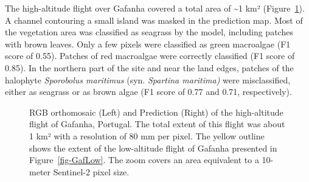 \documentclass[
  number]{elsarticle}
\begin{document}
The high-altitude flight over Gafanha covered a total area of
\textasciitilde1 km² (Figure~\ref{fig-GafHigh}). A channel contouring a
small island was masked in the prediction map. Most of the vegetation
area was classified as seagrass by the model, including patches with
brown leaves. Only a few pixels were classified as green macroalgae (F1
score of 0.55). Patches of red macroalgae were correctly classified (F1
score of 0.85). In the northern part of the site and near the land
edges, patches of the halophyte \emph{Sporobolus maritimus} (syn.
\emph{Spartina maritima)} were misclassified, either as seagrass or as
brown algae (F1 score of 0.77 and 0.71, respectively).

\label{cell-fig-GafHigh}
\begin{figure}[H]


\caption{\label{fig-GafHigh}RGB orthomosaic (Left) and Prediction
(Right) of the high-altitude flight of Gafanha, Portugal. The total
extent of this flight was about 1 km² with a resolution of 80 mm per
pixel. The yellow outline shows the extent of the low-altitude flight of
Gafanha presented in Figure~\ref{fig-GafLow}. The zoom covers an area
equivalent to a 10-meter Sentinel-2 pixel size.}

\end{figure}%
\end{document}
